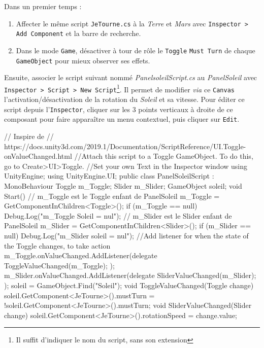\documentclass[a4paper,10pt]{article}
\newenvironment{solution}%
{\begin{tcolorbox}[breakable,colback=red!5!white,colframe=red!75!black,title=Solution]}%
{\end{tcolorbox}}
\newenvironment{boxcode}%
{\begin{tcolorbox}[breakable,colback=gray!5!white,colframe=black]}%
	{\end{tcolorbox}}
\begin{document}
\ifversionenseignant
\begin{solution}
Dans un premier temps :
\begin{enumerate}
	\item Affecter le même script \lstinline|JeTourne.cs| à la \textit{Terre} et \textit{Mars} avec \texttt{Inspector > Add Component} et la barre de recherche.
	\item Dans le mode \texttt{Game}, désactiver à tour de rôle le \texttt{Toggle} \lstinline|Must Turn| de chaque \lstinline|GameObject| pour mieux observer ses effets.
\end{enumerate}	
	
Ensuite, associer le script suivant nommé \textit{PanelsoleilScript.cs} au \textit{PanelSoleil} avec \texttt{Inspector > Script > New Script}\footnote{Il suffit d'indiquer le nom du script, sans son extension}. Il permet de modifier \textit{via} ce \texttt{Canvas} l'activation/désactivation de la rotation du \textit{Soleil} et sa vitesse. Pour éditer ce script depuis l'\texttt{Inspector}, cliquer sur les 3 points verticaux à droite de ce composant pour faire apparaître un menu contextuel, puis cliquer sur \texttt{Edit}.

\begin{boxcode}
	\begin{csharpsansbord}
// Inspire de
// https://docs.unity3d.com/2019.1/Documentation/ScriptReference/UI.Toggle-onValueChanged.html
//Attach this script to a Toggle GameObject. To do this, go to Create>UI>Toggle.
//Set your own Text in the Inspector window
using UnityEngine;
using UnityEngine.UI;
public class PanelSoleilScript : MonoBehaviour
{
	Toggle m_Toggle;
	Slider m_Slider;
	GameObject soleil;
	void Start()
	{
		// m_Toggle est le Toggle enfant de PanelSoleil
		m_Toggle = GetComponentInChildren<Toggle>();
		if (m_Toggle == null)
		Debug.Log("m_Toggle Soleil = nul");
		// m_Slider est le Slider enfant de PanelSoleil
		m_Slider = GetComponentInChildren<Slider>();
		if (m_Slider == null)
		Debug.Log("m_Slider soleil = nul");
		//Add listener for when the state of the Toggle changes, to take action
		m_Toggle.onValueChanged.AddListener(delegate {
			ToggleValueChanged(m_Toggle);
		});
		m_Slider.onValueChanged.AddListener(delegate {
			SliderValueChanged(m_Slider);
		});
		soleil = GameObject.Find("Soleil");
	}
	void ToggleValueChanged(Toggle change)
	{
		soleil.GetComponent<JeTourne>().mustTurn =
		 !soleil.GetComponent<JeTourne>().mustTurn;
	}
	void SliderValueChanged(Slider change)
	{
		soleil.GetComponent<JeTourne>().rotationSpeed = change.value;
	}
}	
\end{csharpsansbord}
\end{boxcode}



\end{solution}
\end{document}
